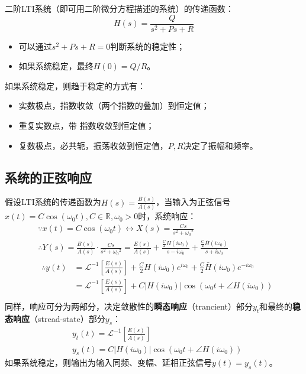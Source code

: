 二阶LTI系统（即可用二阶微分方程描述的系统）的传递函数：
\[
H\left( s \right) =\frac{Q}{s^2+Ps+R}
\]
\begin{itemize}
    \item 可以通过$s^2+Ps+R=0$判断系统的稳定性；
    \item 如果系统稳定，最终$H\left( 0 \right) =Q/R$。
\end{itemize}
如果系统稳定，则趋于稳定的方式有：
\begin{itemize}
    \item 实数极点，指数收敛（两个指数的叠加）到恒定值；
    \item 重复实数点，带 指数收敛到恒定值；
    \item 复数极点，必共轭，振荡收敛到恒定值，$P,R$决定了振幅和频率。
\end{itemize}

\subsection{系统的正弦响应}

假设LTI系统的传递函数为$H\left( s \right) =\frac{B\left( s \right)}{A\left( s \right)}$，当输入为正弦信号$x\left( t \right) =C\cos \left( \omega _0t \right) ,C\in \mathbb{R} ,\omega _0>0$时，系统响应：
\begin{align*}
&\because x\left( t \right) =C\cos \left( \omega _0t \right) \longleftrightarrow X\left( s \right) =\frac{Cs}{s^2+{\omega _0}^2} \\
&\therefore Y\left( s \right) =\frac{B\left( s \right)}{A\left( s \right)}\cdot \frac{Cs}{s^2+{\omega _0}^2}=\frac{E\left( s \right)}{A\left( s \right)}+\frac{\frac{C}{2}H\left( i\omega _0 \right)}{s-i\omega _0}+\frac{\frac{C}{2}\bar{H}\left( i\omega _0 \right)}{s+i\omega _0} \\
&\begin{aligned}
	\therefore y\left( t \right) &=\mathscr{L} ^{-1}\left[ \frac{E\left( s \right)}{A\left( s \right)} \right] +\frac{C}{2}H\left( i\omega _0 \right) e^{i\omega _0}+\frac{C}{2}\bar{H}\left( i\omega _0 \right) e^{-i\omega _0}\\
	&=\mathscr{L} ^{-1}\left[ \frac{E\left( s \right)}{A\left( s \right)} \right] +C\left| H\left( i\omega _0 \right) \right|\cos \left( \omega _0t+\angle H\left( i\omega _0 \right) \right)\\
\end{aligned}
\end{align*}
同样，响应可分为两部分，决定敛散性的{\bf 瞬态响应}（trancient）部分$y_t$和最终的{\bf 稳态响应}（stread-state）部分$y_s$：
\begin{align*}
&y_t\left( t \right) =\mathscr{L} ^{-1}\left[ \frac{E\left( s \right)}{A\left( s \right)} \right] \\
&y_s\left( t \right) =C\left| H\left( i\omega _0 \right) \right|\cos \left( \omega _0t+\angle H\left( i\omega _0 \right) \right)
\end{align*}
如果系统稳定，则输出为输入同频、变幅、延相正弦信号$y\left( t \right) =y_s\left( t \right) $。

